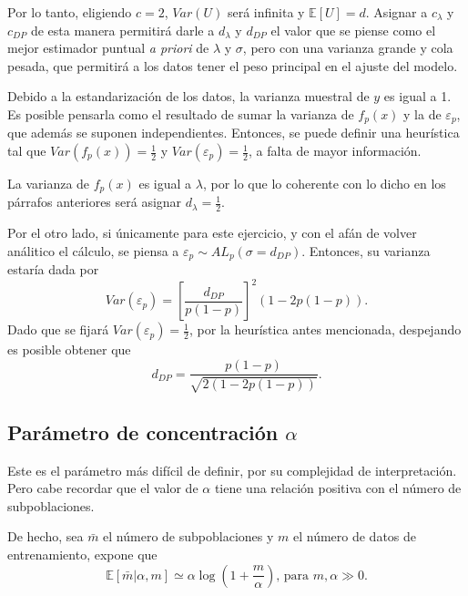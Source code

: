 Por lo tanto, eligiendo $c = 2$, $Var(U)$ ser\'a infinita y $\mathbb{E}[U] = d$. Asignar a $c_\lambda$ y $c_{DP}$ de esta manera permitir\'a darle a $d_\lambda$ y $d_{DP}$ el valor que se piense como el mejor estimador puntual \textit{a priori} de $\lambda$ y $\sigma$, pero con una varianza grande y cola pesada, que permitir\'a a los datos tener el peso principal en el ajuste del modelo. 

Debido a la estandarizaci\'on de los datos, la varianza muestral de $y$ es igual a 1. Es posible pensarla como el resultado de sumar la varianza de $f_p(x)$ y la de $\varepsilon_p$, que adem\'as se suponen independientes. Entonces, se puede definir una heur\'istica tal que $Var(f_p(x)) = \frac{1}{2}$ y $Var(\varepsilon_p) = \frac{1}{2}$, a falta de mayor informaci\'on.

La varianza de $f_p(x)$ es igual a $\lambda$, por lo que lo coherente con lo dicho en los p\'arrafos anteriores ser\'a asignar $d_\lambda = \frac{1}{2}$. 

Por el otro lado, si \'unicamente para este ejercicio, y con el af\'an de volver an\'alitico el c\'alculo, se piensa a $\varepsilon_p \sim AL_p(\sigma = d_{DP})$. Entonces, su varianza estar\'ia dada por
\begin{equation*}
    Var(\varepsilon_p) = 
    \left[\frac{d_{DP}}{p(1-p)}\right]^2
    (1-2p(1-p)).
\end{equation*}
Dado que se fijar\'a $Var(\varepsilon_p) = \frac{1}{2}$, por la heur\'istica antes mencionada, despejando es posible obtener que
\begin{equation*}
    d_{DP} = \frac{p(1-p)}{\sqrt{2(1-2p(1-p))}}.
\end{equation*}

\subsection{Par\'ametro de concentraci\'on $\alpha$}

Este es el par\'ametro m\'as dif\'icil de definir, por su complejidad de interpretaci\'on. Pero cabe recordar que el valor de $\alpha$ tiene una relaci\'on positiva con el n\'umero de subpoblaciones. 

De hecho, sea $\bar{m}$ el n\'umero de subpoblaciones y $m$ el n\'umero de datos de entrenamiento, \cite{Yee_DirProc} expone que
\begin{equation*}
    \mathbb{E}[\bar{m}|\alpha, m] 
    \simeq 
    \alpha
    \log 
    \left(
        1 + \frac{m}{\alpha}
    \right)
    \text{, para } m, \alpha \gg 0.
\end{equation*}

